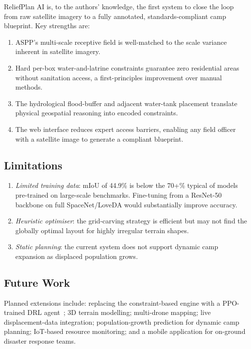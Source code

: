 \documentclass[twocolumn]{article}
\begin{document}
ReliefPlan AI is, to the authors' knowledge, the first system to close the loop from raw satellite
imagery to a fully annotated, standards-compliant camp blueprint.
Key strengths are:
\begin{enumerate}[leftmargin=*,nosep,topsep=2pt]
  \item ASPP's multi-scale receptive field is well-matched to the scale variance inherent in
        satellite imagery.
  \item Hard per-box water-and-latrine constraints guarantee zero residential areas without
        sanitation access, a first-principles improvement over manual methods.
  \item The hydrological flood-buffer and adjacent water-tank placement translate physical
        geospatial reasoning into encoded constraints.
  \item The web interface reduces expert access barriers, enabling any field officer with a
        satellite image to generate a compliant blueprint.
\end{enumerate}

\subsection{Limitations}

\begin{enumerate}[leftmargin=*,nosep,topsep=2pt]
  \item \textit{Limited training data}: mIoU of 44.9\% is below the 70+\% typical of models
        pre-trained on large-scale benchmarks.
        Fine-tuning from a ResNet-50 backbone on full SpaceNet/LoveDA would substantially improve
        accuracy.
  \item \textit{Heuristic optimiser}: the grid-carving strategy is efficient but may not find the
        globally optimal layout for highly irregular terrain shapes.
  \item \textit{Static planning}: the current system does not support dynamic camp expansion as
        displaced population grows.
\end{enumerate}

\subsection{Future Work}

Planned extensions include:
replacing the constraint-based engine with a PPO-trained DRL agent~\cite{flp_drl_2026};
3D terrain modelling; multi-drone mapping; live displacement-data integration;
population-growth prediction for dynamic camp planning; IoT-based resource monitoring; and a
mobile application for on-ground disaster response teams.
\end{document}
